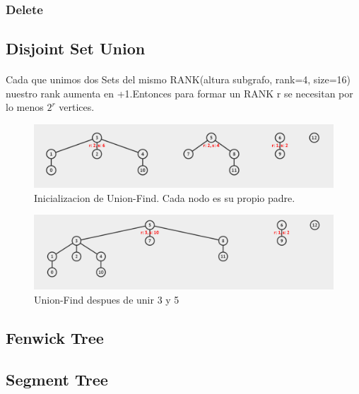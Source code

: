 \subsubsection{Delete}
\raggedbottom
\hrulefill

\subsection{Disjoint Set Union}
\paragraph{}
Cada que unimos dos Sets del mismo RANK(altura subgrafo, rank=4, size=16) nuestro rank aumenta en +1.Entonces para formar un RANK r se necesitan por lo menos $2^r$ vertices.
\begin{figure}[H]
    \centering
    \includegraphics[width=\columnwidth]{code/pictures/UniondFind1.png}
    \caption{Inicializacion de Union-Find. Cada nodo es su propio padre.}
\end{figure}
\begin{figure}[H]
    \centering
    \includegraphics[width=\columnwidth]{code/pictures/UniondFind2.png}
    \caption{Union-Find despues de unir 3 y 5}
\end{figure}
\raggedbottom
\hrulefill

\subsection{Fenwick Tree}
\raggedbottom
\hrulefill

\subsection{Segment Tree}
\raggedbottom
\hrulefill

